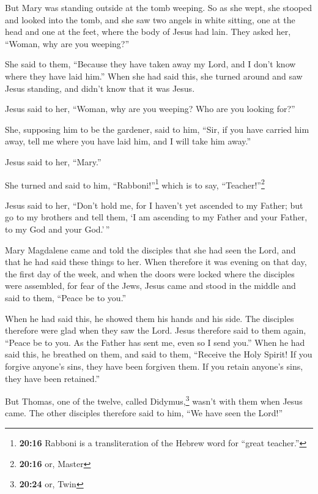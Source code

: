 \begin{paracol}{2}
\begin{otherlanguage}{english}
 But Mary was standing outside at the tomb weeping. So as
she wept, she stooped and looked into the tomb,  and she
saw two angels in white sitting, one at the head and one at the feet,
where the body of Jesus had lain.  They asked her,
``Woman, why are you weeping?''

She said to them, ``Because they have taken away my Lord, and I don't
know where they have laid him.''  When she had said this,
she turned around and saw Jesus standing, and didn't know that it was
Jesus.

 Jesus said to her, ``Woman, why are you weeping? Who are
you looking for?''

She, supposing him to be the gardener, said to him, ``Sir, if you have
carried him away, tell me where you have laid him, and I will take him
away.''

 Jesus said to her, ``Mary.''

She turned and said to him, ``Rabboni!''\footnote{\textbf{20:16} Rabboni
  is a transliteration of the Hebrew word for ``great teacher.''} which
is to say, ``Teacher!''\footnote{\textbf{20:16} or, Master}

 Jesus said to her, ``Don't hold me, for I haven't yet
ascended to my Father; but go to my brothers and tell them, `I am
ascending to my Father and your Father, to my God and your God.'\,''

 Mary Magdalene came and told the disciples that she had
seen the Lord, and that he had said these things to her. 
When therefore it was evening on that day, the first day of the week,
and when the doors were locked where the disciples were assembled, for
fear of the Jews, Jesus came and stood in the middle and said to them,
``Peace be to you.''

 When he had said this, he showed them his hands and his
side. The disciples therefore were glad when they saw the Lord.
 Jesus therefore said to them again, ``Peace be to you.
As the Father has sent me, even so I send you.''  When he
had said this, he breathed on them, and said to them, ``Receive the Holy
Spirit!  If you forgive anyone's sins, they have been
forgiven them. If you retain anyone's sins, they have been retained.''

 But Thomas, one of the twelve, called
Didymus,\footnote{\textbf{20:24} or, Twin} wasn't with them when Jesus
came.  The other disciples therefore said to him, ``We
have seen the Lord!''


\end{otherlanguage}
\end{paracol}
